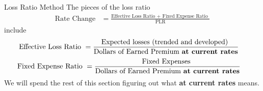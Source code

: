 \documentclass[compress,mathserif]{beamer}
\begin{document}
\begin{frame}{Loss Ratio Method}
The pieces of the loss ratio 
         \begin{align*}
                \text{Rate Change} &= \frac{\text{Effective Loss Ratio + Fixed Expense Ratio }} {\text{PLR}} 
            \end{align*}
include
         \begin{align*}
                \text{Effective Loss Ratio } &= \frac{\text{Expected losses (trended and developed) }} {\text{Dollars of Earned Premium \textbf{at current rates}}} 
            \end{align*}
            \begin{align*}
                \text{Fixed Expense Ratio } &= \frac{\text{Fixed Expenses }} {\text{Dollars of Earned Premium \textbf{at current rates}}} 
            \end{align*}
            We will spend the rest of this section figuring out what \textbf{at current rates} means. 
\end{frame}
\end{document}
